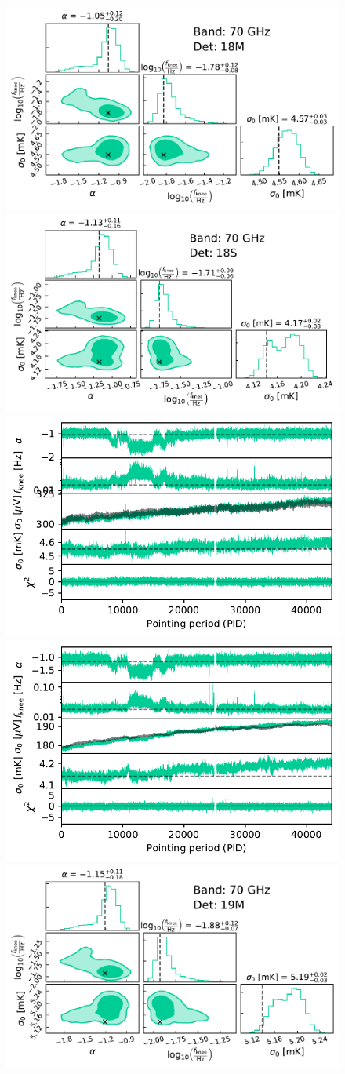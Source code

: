 \documentclass{aa}
\begin{document}
\begin{figure}[p]
        \begin{center}
                \includegraphics[width=0.495\linewidth]{figs/corner_band_070_det_1_mean_new.pdf}
                \includegraphics[width=0.495\linewidth]{figs/corner_band_070_det_2_mean_new.pdf}\\
                \includegraphics[width=0.495\linewidth]{figs/xi_vs_pid_band_070_det_1_mean_new.pdf}
                \includegraphics[width=0.495\linewidth]{figs/xi_vs_pid_band_070_det_2_mean_new.pdf}\\
                \vspace*{1mm}
                \includegraphics[width=0.495\linewidth]{figs/corner_band_070_det_3_mean_new.pdf}

\end{center}
\end{figure}
\end{document}
